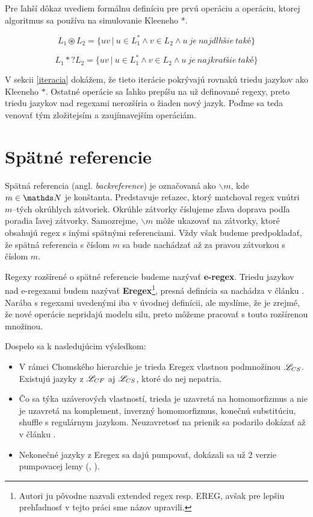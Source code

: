 Pre ľahší dôkaz uvediem formálnu definíciu pre prvú operáciu a operáciu, ktorej algoritmus sa používa na simulovanie Kleeneho $*$.

\begin{df}
$$ L_{1} \circledast L_{2} = \lbrace uv ~|~ u \in L_1^* \land v \in L_2 \land u~je~najdlhšie~také \rbrace$$
\end{df}

\begin{df}
$$ L_{1} *? L_{2} = \lbrace uv ~|~ u \in L_1^* \land v \in L_2 \land u~je~najkratšie~také \rbrace $$
\end{df}

V sekcii \ref{iteracia} dokážem, že tieto iterácie pokrývajú rovnakú triedu jazykov ako Kleeneho $*$. Ostatné operácie sa ľahko prepíšu na už definované regexy, preto triedu jazykov nad regexami nerozšíria o žiaden nový jazyk. Poďme sa teda venovať tým zložitejsím a zaujímavejším operáciám.

\section{Spätné referencie}\label{chap:backref1}

Spätná referencia (angl. \textit{backreference}) je označovaná ako $ \backslash m $, kde $m \in \N$ je kon\-štan\-ta. Predstavuje reťazec, ktorý matchoval regex vnútri $m$--tých okrúhlych zátvoriek. Okrúhle zátvorky číslujeme zľava doprava podľa poradia ľavej zátvorky. Samozrejme, $\backslash m$ môže ukazovať na zátvorky, ktoré obsahujú regex s inými spätnými referenciami. Vždy však budeme predpokladať, že spätná referencia s číslom $m$ sa bude nachádzať až za pravou zátvorkou s číslom $m$.

Regexy rozšírené o spätné referencie budeme nazývať \textbf{e-regex}. Triedu jazykov nad e-regexami budem nazývať \textbf{Eregex}\footnote{Autori ju pôvodne nazvali extended regex resp. EREG, avšak pre lepšiu prehľadnosť v tejto práci sme názov upravili.}, presná definícia sa nachádza v článku \cite{ExtendedRegexPower}.  Narába s regexami uvedenými iba v úvodnej definícii, ale myslíme, že je zrejmé, že nové operácie nepridajú modelu silu, preto môžeme pracovať s touto rozšírenou množinou.

Dospelo sa k nasledujúcim výsledkom:
\begin{itemize}
\item V rámci Chomského hierarchie je trieda Eregex vlastnou podmnožinou $\mathscr{L}_{CS}$. Existujú jazyky z $\mathscr{L}_{CF}$ aj $\mathscr{L}_{CS}$, ktoré do nej nepatria.
\item  Čo sa týka uzáverových vlastností, trieda je uzavretá na homomorfizmus a nie je uzavretá na komplement, inverzný homomorfizmus, konečnú substitúciu, shuffle s regulárnym jazykom. Neuzavretosť na prienik sa podarilo dokázať až v článku \cite{ExtendedRegexIntersec}.
\item Nekonečné jazyky z Eregex sa dajú pumpovať, dokázali sa už 2 verzie pumpovacej lemy (\cite[Lemma 1]{ExtendedRegexPower}, \cite[Lemma 3]{ExtendedRegexIntersec}).
\end{itemize}

